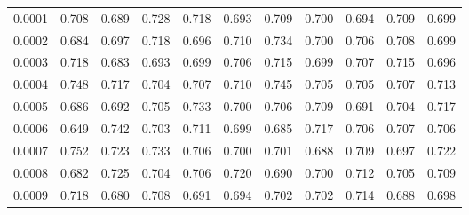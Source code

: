 \begin{table}[h]
\begin{tabular}{rrrrrrrrrrr}
0.0001                     & 0.708                & 0.689                & 0.728                & 0.718                & 0.693                & 0.709                & 0.700                & 0.694                & 0.709                & 0.699                \\
0.0002                     & 0.684                & 0.697                & 0.718                & 0.696                & 0.710                & 0.734                & 0.700                & 0.706                & 0.708                & 0.699                \\
0.0003                     & 0.718                & 0.683                & 0.693                & 0.699                & 0.706                & 0.715                & 0.699                & 0.707                & 0.715                & 0.696                \\
0.0004                     & 0.748                & 0.717                & 0.704                & 0.707                & 0.710                & 0.745                & 0.705                & 0.705                & 0.707                & 0.713                \\
0.0005                     & 0.686                & 0.692                & 0.705                & 0.733                & 0.700                & 0.706                & 0.709                & 0.691                & 0.704                & 0.717                \\
0.0006                     & 0.649                & 0.742                & 0.703                & 0.711                & 0.699                & 0.685                & 0.717                & 0.706                & 0.707                & 0.706                \\
0.0007                     & 0.752                & 0.723                & 0.733                & 0.706                & 0.700                & 0.701                & 0.688                & 0.709                & 0.697                & 0.722                \\
0.0008                     & 0.682                & 0.725                & 0.704                & 0.706                & 0.720                & 0.690                & 0.700                & 0.712                & 0.705                & 0.709                \\
0.0009                     & 0.718                & 0.680                & 0.708                & 0.691                & 0.694                & 0.702                & 0.702                & 0.714                & 0.688                & 0.698          \\ \hline       
\end{tabular}
\label{tabla100_10000}
\end{table}

